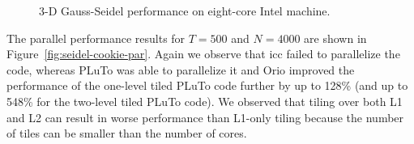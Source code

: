 {\begin{figure} [htb]
\begin{center} 
    
\end{center}
\vspace{-.2in} 
\caption{3-D Gauss-Seidel performance on eight-core Intel machine.} 
\label{fig:seidel-cookie-results} 
\vspace{-.1in}
\end{figure} 

The parallel performance results for $T=500$ and $N=4000$ are shown in
Figure~\ref{fig:seidel-cookie-par}. Again we observe that icc failed to
parallelize the code, whereas PLuTo was able to parallelize it and Orio
improved the performance of the one-level tiled PLuTo code further by up to
128\% (and up to 548\% for the two-level tiled PLuTo code). We observed that
tiling over both L1 and L2 can result in worse performance than L1-only
tiling because the number of tiles can be smaller than the number of cores.
} %


